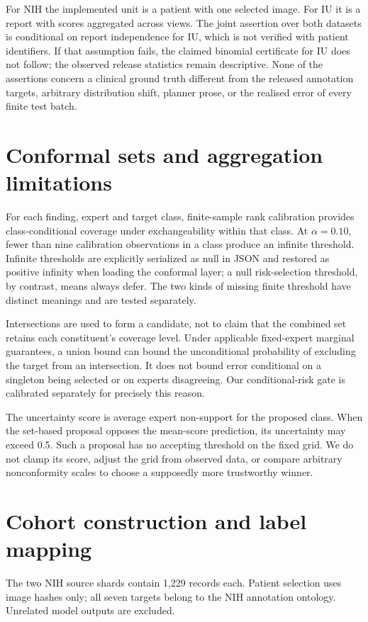 \documentclass[10pt,a4paper]{article}
\begin{document}
For NIH the implemented unit is a patient with one selected image. For IU it is a report with scores aggregated across views. The joint assertion over both datasets is conditional on report independence for IU, which is not verified with patient identifiers. If that assumption fails, the claimed binomial certificate for IU does not follow; the observed release statistics remain descriptive. None of the assertions concern a clinical ground truth different from the released annotation targets, arbitrary distribution shift, planner prose, or the realised error of every finite test batch.

\section{Conformal sets and aggregation limitations}
For each finding, expert and target class, finite-sample rank calibration provides class-conditional coverage under exchangeability within that class. At $\alpha=0.10$, fewer than nine calibration observations in a class produce an infinite threshold. Infinite thresholds are explicitly serialized as null in JSON and restored as positive infinity when loading the conformal layer; a null risk-selection threshold, by contrast, means always defer. The two kinds of missing finite threshold have distinct meanings and are tested separately.

Intersections are used to form a candidate, not to claim that the combined set retains each constituent's coverage level. Under applicable fixed-expert marginal guarantees, a union bound can bound the unconditional probability of excluding the target from an intersection. It does not bound error conditional on a singleton being selected or on experts disagreeing. Our conditional-risk gate is calibrated separately for precisely this reason.

The uncertainty score is average expert non-support for the proposed class. When the set-based proposal opposes the mean-score prediction, its uncertainty may exceed 0.5. Such a proposal has no accepting threshold on the fixed grid. We do not clamp its score, adjust the grid from observed data, or compare arbitrary nonconformity scales to choose a supposedly more trustworthy winner.

\section{Cohort construction and label mapping}
The two NIH source shards contain 1,229 records each. Patient selection uses image hashes only; all seven targets belong to the NIH annotation ontology. Unrelated model outputs are excluded.
\end{document}
